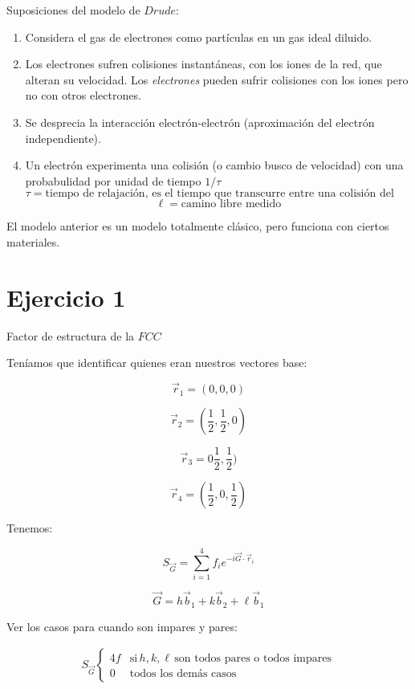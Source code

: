 \documentclass{article}
\begin{document}
Suposiciones del modelo de $Drude$:

\begin{enumerate}
\item Considera el gas de electrones como partículas en un gas ideal diluido.\\
\item Los electrones sufren colisiones instantáneas, con los iones de la red, que alteran su velocidad. Los \textit{electrones} pueden sufrir colisiones con los iones pero no con otros electrones. \\
\item Se desprecia la interacción electrón-electrón (aproximación del electrón independiente).\\
\item Un electrón experimenta una colisión (o cambio busco de velocidad) con una probabulidad por unidad de tiempo $1/\tau$\\
\[  \tau = \text{tiempo de relajación, es el tiempo que transcurre entre una colisión del electrón con un ión y otra colisión} \]
\[ \ell = \text{camino libre medido}  \]
\end{enumerate}

El modelo anterior es un modelo totalmente clásico, pero funciona con ciertos materiales.

\section{Ejercicio 1}

Factor de estructura de la $FCC$

Teníamos que identificar quienes eran nuestros vectores base:

\[ \vec{r}_{1} = (0,0,0)  \]

\[ \vec{r}_{2} = (\frac{1}{2},\frac{1}{2}, 0) \]

\[ \vec{r}_{3} = {0} \frac{1}{2}, \frac{1}{2})  \]

\[ \vec{r}_{4} = (\frac{1}{2}, 0, \frac{1}{2})  \]


Tenemos:


\[ S_{\vec{G}} = \sum\limits^{4}_{i=1} f_{i} e^{-i\vec{G}\cdot \vec{r}_{i}}  \]


\[ \vec{G} = h\vec{b}_{1} + k\vec{b}_{2} + \ell \vec{b}_{1}  \]


Ver los casos para cuando son impares y pares:

\begin{equation}
\begin{split} 
 S_{\vec{G}}   \left\{   \begin{array}{cc}
 4f & \text{si} \, h,k,\ell \, \text{son todos pares o todos impares}\\
 0 & \text{todos los demás casos}
\end{array}  \right.
\end{split}
\end{equation}
\end{document}
